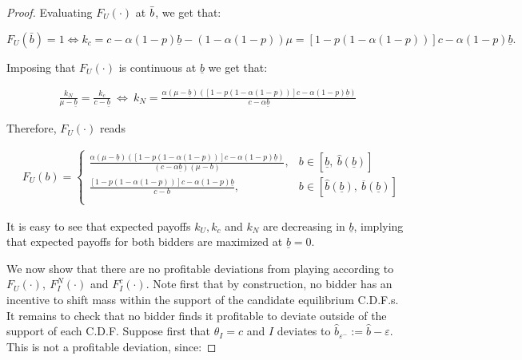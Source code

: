 \documentclass[11pt]{article}
\theoremstyle{plain}
\theoremstyle{definition}
\theoremstyle{plain}
\theoremstyle{plain}
\theoremstyle{plain}
\theoremstyle{plain}
\numberwithin{equation}{section}
\begin{document}
\begin{proof}
\noindent Evaluating $ F_U(\cdot) $ at $ \Bar{b} $, we get that:

\begin{equation*}
    F_U(\bar{b})=1 \iff k_c = c - \alpha(1-p) \underline{b} - \left(1-\alpha(1-p) \right)\mu = \left[1-p(1-\alpha(1-p)) \right]c-\alpha(1-p)\underline{b}.
\end{equation*}

\vspace{4mm}

\noindent Imposing that $ F_U(\cdot) $ is continuous at $ \underline{b} $ we get that:

\begin{align*}
    \frac{k_N}{\mu - \underline{b}} = \frac{k_c}{c - \underline{b}} \ \iff \
    k_N = \frac{\alpha(\mu-\underline{b})\left(\left[1-p(1-\alpha(1-p)) \right]c-\alpha(1-p)\underline{b}\right)}{c-\alpha \underline{b}}
\end{align*}

\vspace{0.4cm}

\noindent Therefore, $ F_U(\cdot) $ reads

\begin{align*}
    & F_U(b) = \begin{cases}
        \frac{\alpha(\mu-\underline{b})\left(\left[1-p(1-\alpha(1-p)) \right]c-\alpha(1-p)\underline{b}\right)}{(c-\alpha \underline{b})(\mu-b)}, & b \in \left[\underline{b}, \ \hat{b}(\underline{b}) \right] \\[12pt]
    \frac{\left[1-p(1-\alpha(1-p)) \right]c-\alpha(1-p)\underline{b}}{c-b}, & b \in \left[\hat{b}(\underline{b}), \ \overline{b}(\underline{b}) \right] \\[12pt]
    \end{cases}
\end{align*}

\vspace{4mm}

\noindent It is easy to see that expected payoffs $k_U, k_c$ and $k_N$ are decreasing in $\underline{b}$, implying that expected payoffs for both bidders are maximized at $\underline{b}=0$.

\vspace{4mm}

\noindent We now show that there are no profitable deviations from playing according to $ F_U(\cdot), \ F_I^N(\cdot) $ and $ F_I^c(\cdot) $. Note first that by construction, no bidder has an incentive to shift mass within the support of the candidate equilibrium C.D.F.s. It remains to check that no bidder finds it profitable to deviate outside of the support of each C.D.F. Suppose first that $ \theta_I = c $ and $ I $ deviates to $ \hat{b}_{\varepsilon^-} := \hat{b}-\varepsilon $. This is not a profitable deviation, since:


\end{proof}
\end{document}
